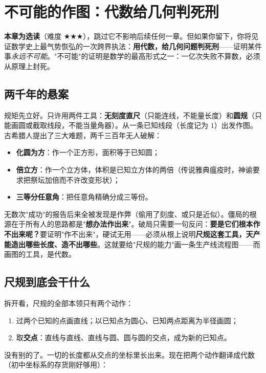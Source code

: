 \chapter{不可能的作图：代数给几何判死刑}\label{ch:zuotu}

\noindent\textbf{本章为选读}（难度 $\bigstar\bigstar\bigstar$），跳过它不影响后续任何一章。但如果你留下，你将见证数学史上最气势恢弘的一次跨界执法：\textbf{用代数，给几何问题判死刑}——证明某件事\emph{永远不可能}。"不可能"的证明是数学的最高形式之一：一亿次失败不算数，必须从原理上封死。

\section{两千年的悬案}

规矩先立好。只许用两件工具：\textbf{无刻度直尺}（只能连线，不能量长度）和\textbf{圆规}（只能画圆或截取线段，不能当量角器）。从一条已知线段（长度记为 $1$）出发作图。古希腊人提出了三大难题，两千三百年无人破解：

\begin{itemize}
\item \textbf{化圆为方}：作一个正方形，面积等于已知圆；
\item \textbf{倍立方}：作一个立方体，体积是已知立方体的两倍（传说雅典瘟疫时，神谕要求把祭坛加倍而不许改变形状）；
\item \textbf{三等分任意角}：把任意角精确分成三等份。
\end{itemize}

无数次"成功"的报告后来全被发现是作弊（偷用了刻度、或只是近似）。僵局的根源在于所有人的思路都是"\textbf{想办法作出来}"。破局只需要一句反问：\textbf{要是它们根本作不出来呢？}要证明"作不出来"，硬试无用——必须从根上说明\textbf{尺规这套工具，天产能造出哪些长度、造不出哪些}。这就要给"尺规的能力"画一条生产线流程图——而画图的工具，是代数。

\section{尺规到底会干什么}

拆开看，尺规的全部本领只有两个动作：
\begin{enumerate}
\item 过两个已知的点画直线；以已知点为圆心、已知两点距离为半径画圆；
\item 取\textbf{交点}：直线与直线、直线与圆、圆与圆的交点，成为新的已知点。
\end{enumerate}
没有别的了。一切的长度都从交点的坐标里长出来。现在把两个动作翻译成代数（初中坐标系的存货刚好够用）：

